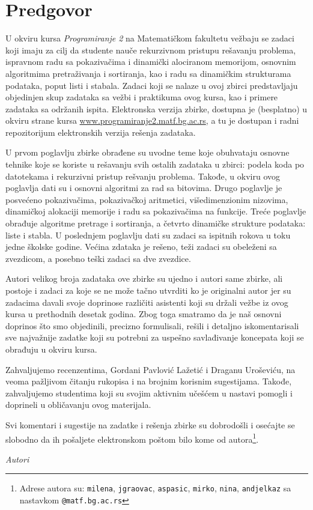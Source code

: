 
\chapter*{Predgovor}

U okviru kursa {\em Programiranje 2} na Matematičkom fakultetu vežbaju se zadaci 
koji imaju za cilj da studente nauče rekurzivnom pristupu rešavanju problema, 
ispravnom radu sa pokazivačima i dinamički alociranom memorijom, osnovnim algoritmima 
pretraživanja i sortiranja, kao i radu sa dinamičkim strukturama podataka, 
poput listi i stabala. Zadaci koji se nalaze u ovoj zbirci predstavljaju 
objedinjen skup zadataka sa vežbi i praktikuma ovog kursa, kao i primere 
zadataka sa održanih ispita. Elektronska verzija zbirke, dostupna je 
(besplatno) u okviru strane kursa \url{www.programiranje2.matf.bg.ac.rs}, 
a tu je dostupan i radni repozitorijum elektronskih verzija rešenja zadataka.

U prvom poglavlju zbirke obrađene su uvodne teme koje obuhvataju osnovne tehnike koje se koriste u rešavanju svih ostalih zadataka u zbirci: podela koda po datotekama i rekurzivni pristup rešvanju problema. Takođe, u okviru ovog poglavlja dati su i osnovni algoritmi za rad sa bitovima. Drugo poglavlje je posvećeno pokazivačima, pokazivačkoj aritmetici, višedimenzionim nizovima, dinamičkoj alokaciji memorije i radu sa pokazivačima na funkcije. Treće poglavlje obrađuje algoritme pretrage i sortiranja, a četvrto dinamičke strukture podataka: liste i stabla. U poslednjem poglavlju dati su zadaci sa ispitnih rokova u toku jedne školske godine. Većina zdataka je rešeno, teži zadaci su obeleženi sa zvezdicom, a posebno teški zadaci sa dve zvezdice.


Autori velikog broja zadataka ove zbirke su ujedno i autori same zbirke, ali postoje 
i zadaci za koje se ne može tačno utvrditi ko je originalni autor jer su zadacima 
davali svoje doprinose različiti asistenti koji su držali vežbe iz ovog kursa u 
prethodnih desetak godina. Zbog toga smatramo da je naš osnovni doprinos 
što smo objedinili, precizno formulisali, rešili i detaljno iskomentarisali 
sve najvažnije zadatke koji su potrebni za uspešno savlađivanje koncepata 
koji se obrađuju u okviru kursa. 

\newpage
Zahvaljujemo recenzentima, Gordani Pavlović Lažetić i Draganu Uroševiću, na veoma pažljivom čitanju rukopisa i na brojnim korisnim sugestijama. Takođe, zahvaljujemo studentima koji su svojim aktivnim učešćem u nastavi pomogli i doprineli u obličavanju ovog materijala. 

Svi komentari i sugestije na zadatke i rešenja zbirke su dobrodošli i osećajte se slobodno da ih pošaljete elektronskom poštom bilo kome od autora\footnote{Adrese autora su: \texttt{milena}, \texttt{jgraovac}, \texttt{aspasic}, \texttt{mirko}, \texttt{nina}, \texttt{andjelkaz} sa nastavkom \texttt{@matf.bg.ac.rs}}. 





\bigskip

\begin{flushright}
{\em Autori}
\end{flushright}
